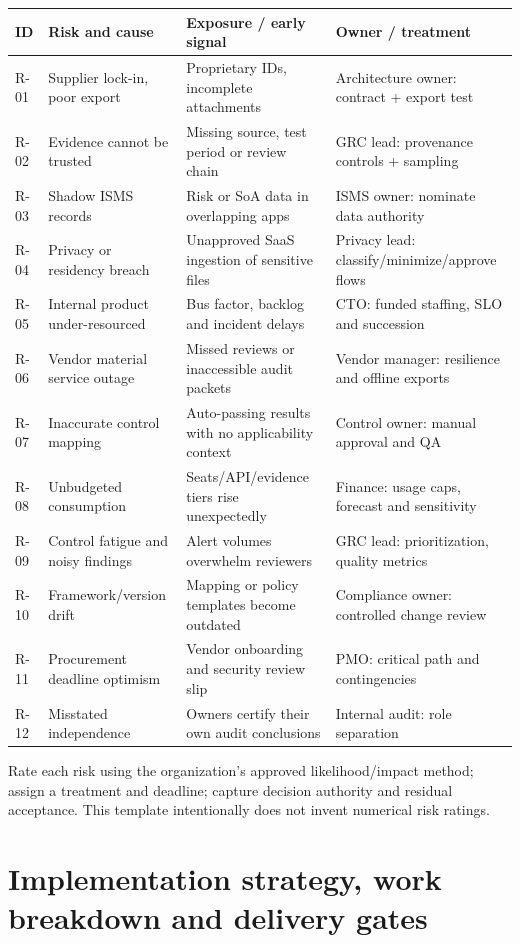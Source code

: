 \documentclass[10pt,letterpaper]{article}
\begin{document}
\begin{longtable}{@{}L{0.58in}L{1.76in}L{1.98in}L{1.86in}@{}}
\toprule
\textbf{ID} & \textbf{Risk and cause} & \textbf{Exposure / early signal} & \textbf{Owner / treatment}\\\midrule\endhead
R-01 & Supplier lock-in, poor export & Proprietary IDs, incomplete attachments & Architecture owner: contract + export test\\
R-02 & Evidence cannot be trusted & Missing source, test period or review chain & GRC lead: provenance controls + sampling\\
R-03 & Shadow ISMS records & Risk or SoA data in overlapping apps & ISMS owner: nominate data authority\\
R-04 & Privacy or residency breach & Unapproved SaaS ingestion of sensitive files & Privacy lead: classify/minimize/approve flows\\
R-05 & Internal product under-resourced & Bus factor, backlog and incident delays & CTO: funded staffing, SLO and succession\\
R-06 & Vendor material service outage & Missed reviews or inaccessible audit packets & Vendor manager: resilience and offline exports\\
R-07 & Inaccurate control mapping & Auto-passing results with no applicability context & Control owner: manual approval and QA\\
R-08 & Unbudgeted consumption & Seats/API/evidence tiers rise unexpectedly & Finance: usage caps, forecast and sensitivity\\
R-09 & Control fatigue and noisy findings & Alert volumes overwhelm reviewers & GRC lead: prioritization, quality metrics\\
R-10 & Framework/version drift & Mapping or policy templates become outdated & Compliance owner: controlled change review\\
R-11 & Procurement deadline optimism & Vendor onboarding and security review slip & PMO: critical path and contingencies\\
R-12 & Misstated independence & Owners certify their own audit conclusions & Internal audit: role separation\\
\bottomrule
\end{longtable}
\normalsize
Rate each risk using the organization's approved likelihood/impact method; assign a treatment and deadline; capture decision authority and residual acceptance. This template intentionally does not invent numerical risk ratings.

\section{Implementation strategy, work breakdown and delivery gates}
\end{document}
